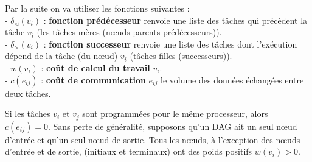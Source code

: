 Par la suite on va utiliser les fonctions suivantes :\\
- $\delta_\triangleleft(v_i)$ : \textbf{fonction prédécesseur} renvoie une liste des tâches qui précèdent la tâche $v_i$ (les tâches mères (nœuds parents prédécesseurs)).\\
- $\delta_\triangleright(v_i)$  : \textbf{fonction successeur} renvoie une liste des tâches dont l'exécution dépend de la tâche (du nœud) $v_i$ (tâches filles (successeurs)).\\
- $w(v_i)$ : \textbf{coût de calcul du travail} $v_i$.\\
- $c(e_{ij})$ : \textbf{coût de communication} $e_{ij}$ le volume des données échangées entre deux tâches.

Si les tâches $v_i$ et $v_j$ sont programmées pour le même processeur, alors $c(e_{ij}) = 0$. 
Sans perte de généralité, supposons qu'un DAG ait un seul nœud d'entrée et qu'un seul nœud de sortie. 
Tous les nœuds, à l'exception des nœuds d'entrée et de sortie, (initiaux et terminaux) ont des poids positifs $w(v_i) > 0$. 

